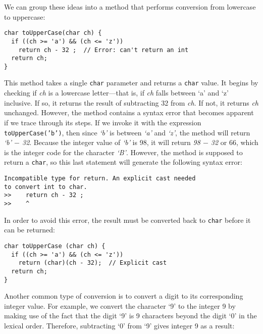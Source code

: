 \noindent We can group these ideas into a method that performs
conversion from lowercase to uppercase:

\begin{jjjlisting}
\begin{lstlisting}
char toUpperCase(char ch) {
  if ((ch >= 'a') && (ch <= 'z'))
    return ch - 32 ;  // Error: can't return an int
  return ch;
}
\end{lstlisting}
\end{jjjlisting}

\noindent This method
takes a single {\tt char} parameter and returns a {\tt char} value. It
begins by checking if {\it ch} is a lowercase letter---that is, if
{\it ch} falls between `a' and `z' inclusive.  If so, it returns the result
of subtracting 32 from {\it ch}.  If not, it returns {\it ch}
unchanged. However, the method contains a syntax error that becomes
apparent if we trace through its steps. If we invoke it with the
expression {\tt toUpperCase('b')}, then since {\it `b'} is between {\it `a'}
and {\it `z'}, the method will return {\it `b' $-$ 32}.  Because the integer
value of {\it `b'} is 98, it will return {\it 98 $-$ 32} or 66, which is the integer
code for the character {\it `B'}.  However, the method is supposed to return
a {\tt char}, so this last statement will generate the following syntax
error:


\begin{jjjlisting}
\begin{lstlisting}
Incompatible type for return. An explicit cast needed 
to convert int to char.
>>    return ch - 32 ;
>>    ^
\end{lstlisting}
\end{jjjlisting}

\noindent In order to avoid this error, the result must be
converted back to {\tt char} before it can be returned:

\begin{jjjlisting}
\begin{lstlisting}
char toUpperCase (char ch) {
  if ((ch >= 'a') && (ch <= 'z'))
    return (char)(ch - 32);  // Explicit cast
  return ch;
}
\end{lstlisting}
\end{jjjlisting}

\noindent Another common type of conversion is to convert a
digit to its corresponding integer
value.  For example, we convert the character `9' to the integer 9 by
making use of the fact that the digit `9' is 9 characters beyond the
digit `0' in the lexical order.  Therefore, subtracting `0' from `9'
gives integer 9 as a result:

